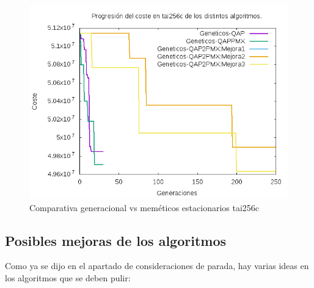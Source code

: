 \begin{figure}[H]
\centering
\includegraphics[width=0.7\linewidth]{graficos/comparativaGeneracionaltai256c}
\caption{Comparativa generacional vs meméticos estacionarios tai256c}
\label{fig:comparativaGeneracionaltai256c}
\end{figure}

\subsection{Posibles mejoras de los algoritmos}

Como ya se dijo en el apartado de consideraciones de parada, hay varias ideas en los algoritmos que se deben pulir:\\

